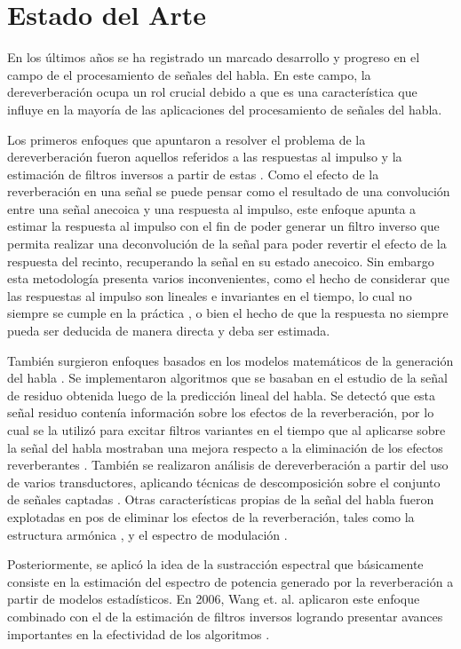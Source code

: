 \section{Estado del Arte}
En los últimos años se ha registrado un marcado desarrollo y progreso en el campo de el procesamiento de señales del habla. En este campo, la dereverberación ocupa un rol crucial debido a que es una característica que influye en la mayoría de las aplicaciones del procesamiento de señales del habla.

Los primeros enfoques que apuntaron a resolver el problema de la dereverberación fueron aquellos referidos a las respuestas al impulso y la estimación de filtros inversos a partir de estas \cite{filtros_inv}. Como el efecto de la reverberación en una señal se puede pensar como el resultado de una convolución entre una señal anecoica y una respuesta al impulso, este enfoque apunta a estimar la respuesta al impulso con el fin de poder generar un filtro inverso que permita realizar una deconvolución de la señal para poder revertir el efecto de la respuesta del recinto, recuperando la señal en su estado anecoico. Sin embargo esta metodología presenta varios inconvenientes, como el hecho de considerar que las respuestas al impulso son lineales e invariantes en el tiempo, lo cual no siempre se cumple en la práctica \cite{LTI}, o bien el hecho de que la respuesta no siempre pueda ser deducida de manera directa y deba ser estimada. 


También surgieron enfoques basados en los modelos matemáticos de la generación del habla \cite{rabiner}. Se implementaron algoritmos que se basaban en el estudio de la señal de residuo obtenida luego de la predicción lineal del habla. Se detectó que esta señal residuo contenía información sobre los efectos de la reverberación, por lo cual se la utilizó para excitar filtros variantes en el tiempo que al aplicarse sobre la señal del habla mostraban una mejora respecto a la eliminación de los efectos reverberantes \cite{LPresiduo}. También se realizaron análisis de dereverberación a partir del uso de varios transductores, aplicando  técnicas de descomposición sobre el conjunto de señales captadas \cite{multichannel}. Otras características propias de la señal del habla fueron explotadas en pos de eliminar los efectos de la reverberación, tales como la estructura armónica \cite{armonica}, y el espectro de modulación \cite{mod}. 

Posteriormente, se aplicó la idea de la sustracción espectral \cite{spect_subtrac} \cite{spect_subtrac2} que básicamente consiste en la estimación del espectro de potencia generado por la reverberación a partir de modelos estadísticos. En 2006, Wang et. al. aplicaron este enfoque combinado con el de la estimación de filtros inversos logrando presentar avances importantes en la efectividad de los algoritmos \cite{two_stage}.
 
